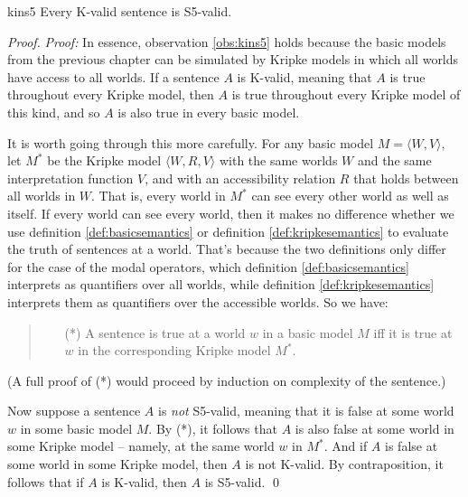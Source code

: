 \begin{observation}{kins5}
  Every K-valid sentence is S5-valid.
\end{observation}
%
\begin{proof}
  \emph{Proof:} In essence, observation \ref{obs:kins5} holds because the basic
  models from the previous chapter can be simulated by Kripke models in which
  all worlds have access to all worlds. If a sentence $A$ is K-valid, meaning
  that $A$ is true throughout every Kripke model, then $A$ is true throughout
  every Kripke model of this kind, and so $A$ is also true in every basic model.

  It is worth going through this more carefully. For any basic model
  $M = \langle W,V \rangle$, let $M^*$ be the Kripke model
  $\langle W,R,V \rangle$ with the same worlds $W$ and the same interpretation
  function $V$, and with an accessibility relation $R$ that holds between all
  worlds in $W$. That is, every world in $M^*$ can see every other world as well
  as itself. If every world can see every world, then it makes no difference
  whether we use definition \ref{def:basicsemantics} or definition
  \ref{def:kripkesemantics} to evaluate the truth of sentences at a world.
  That's because the two definitions only differ for the case of the modal
  operators, which definition \ref{def:basicsemantics} interprets as quantifiers
  over all worlds, while definition \ref{def:kripkesemantics} interprets them as
  quantifiers over the accessible worlds. So we have:
  \begin{quote}
  \begin{itemize}
  \item[(*)] A sentence is true at a world $w$ in a basic model $M$ iff
    it is true at $w$ in the corresponding Kripke model $M^*$.
  \end{itemize}
  \end{quote}
  (A full proof of (*) would proceed by induction on complexity of the
  sentence.)

  Now suppose a sentence $A$ is \emph{not} S5-valid, meaning that it is false at
  some world $w$ in some basic model $M$. By (*), it follows that $A$ is also
  false at some world in some Kripke model -- namely, at the same world $w$ in
  $M^*$. And if $A$ is false at some world in some Kripke model, then $A$ is not
  K-valid. By contraposition, it follows that if $A$ is K-valid, then $A$ is
  S5-valid. \qed
\end{proof}

